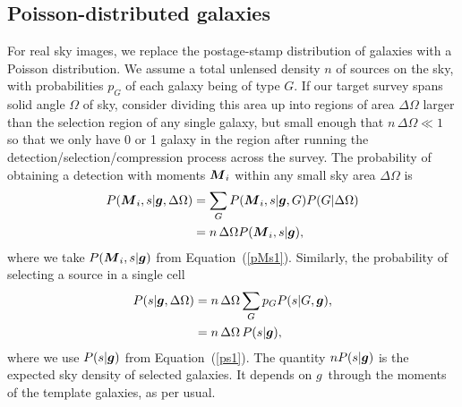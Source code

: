 \documentclass[11pt,preprint,flushrt]{aastex}
\def\eqq#1{Equation~(\ref{#1})}
\newcommand{\vecg}{\mbox{\boldmath $g$}}
\newcommand{\vecM}{\mbox{\boldmath $M$}}
\begin{document}
\subsection{Poisson-distributed galaxies}
For real sky images, we replace the postage-stamp distribution of
galaxies with a Poisson distribution.  We assume a total unlensed
density $n$ of sources on the sky, with probabilities $p_G$ of each
galaxy being of type $G$.
If our target survey spans solid angle
$\Omega$ of sky, consider dividing this area up into regions of area
$\Delta\Omega$ larger than the selection region of any single galaxy,
but small enough that $n\,\Delta\Omega\ll1$ so that we only
have 0 or 1 galaxy in the region after running the
detection/selection/compression process across the survey.  The
probability of obtaining a detection with moments $\vecM_i$ within any
small sky area $\Delta\Omega$ is
\begin{align}
P(\vecM_i, s | \vecg, \Delta\Omega) & = \sum_G P(\vecM_i, s | \vecg,
                                      G) P(G | \Delta\Omega) \\ 
 & = n\,\Delta\Omega P(\vecM_i, s | \vecg),
\end{align}
where we take $P(\vecM_i,s | \vecg)$ from \eqq{pMs1}.  Similarly, the
probability of selecting a source in a single cell 
\begin{align}
P(s | \vecg, \Delta\Omega) & = n\,\Delta\Omega \sum_G p_G P(s | G, \vecg), \\
  & = n\, \Delta\Omega\, P(s|\vecg),
\end{align}
where we use $P(s|\vecg)$ from \eqq{ps1}.
The quantity $nP(s|\vecg)$ is the expected sky density
of selected galaxies.  It depends on \vecg\ through the moments of the
template galaxies, as per usual.
\end{document}

